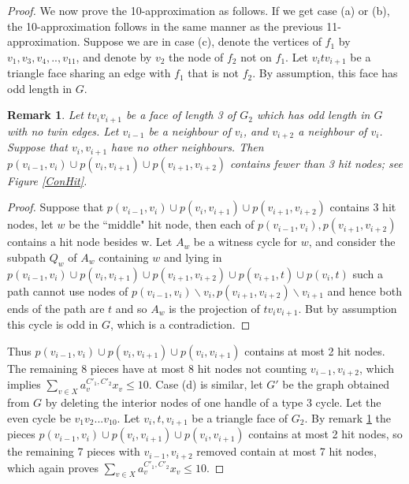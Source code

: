 \documentclass{article}
\newcommand{\0}{\mathbb{0}}
\newcommand{\1}{\mathbb{1}}
\newtheorem{remark}[theorem]{Remark}
\begin{document}
\begin{proof} 
We now prove the 10-approximation as follows. If we get case (a) or (b),  the 10-approximation follows in the same manner as the previous 11-approximation.  Suppose we are in case (c), denote the vertices of $f_1$ by  $v_1,v_3,v_4 ,.., v_{11}$, and denote by $v_2$ the node of $f_2$ not on $f_1$.  Let $v_i t v_{i+1}$ be a triangle face sharing an edge with $f_1$ that is not $f_2$. By assumption, this face has odd length in $G$.

\begin{remark}\label{consecutive}
Let $ t v_i v_{i+1} $ be a face of length 3 of $G_2$ which has odd length in $G$ with no twin edges. Let $ v_{i-1} $ be a neighbour of $v_i$, and $v_{i+2}$ a neighbour of $v_i$. Suppose that $v_i,v_{i+1}$ have no other neighbours. Then  $ p(v_{i-1} , v_i ) \cup p(v_i,v_{i+1} ) \cup p(v_{i+1},v_{i+2} ) $  contains fewer than 3 hit nodes; see Figure \ref{ConHit}.
\end{remark}
\begin{proof}
 Suppose that $ p(v_{i-1} , v_i ) \cup p(v_i,v_{i+1} ) \cup p(v_{i+1},v_{i+2} ) $ contains 3 hit nodes, let $w$ be the  ``middle" hit node, then each of $ p(v_{i-1} , v_i ) ,p(v_{i+1},v_{i+2} ) $ contains a hit node besides w. Let $A_w$ be a witness cycle for $w$, and consider the subpath $ Q_w$ of $A_w$ containing $w $ and lying in $ p(v_{i-1} , v_i ) \cup p(v_i,v_{i+1} ) \cup p(v_{i+1},v_{i+2} ) \cup p(v_{i+1},t) \cup p(v_i,t)  $  such a path cannot use nodes of $ p(v_{i-1} , v_i ) \backslash v_i ,p(v_{i+1},v_{i+2} ) \backslash v_{i+1} $  and hence both ends of the path are  $t$ and so $A_w$ is the projection of $t v_i v_{i+1} $. But by assumption this cycle is odd in $G$, which is a contradiction.  
\end{proof} 

Thus $p(v_{i-1},v_i) \cup p(v_{i},v_{i+1}) \cup p(v_{i},v_{i+1})$ contains at most 2 hit nodes. The remaining 8 pieces have at most 8 hit nodes not counting $v_{i-1},v_{i+2}$, which implies $\sum_{v \in X} a^{C'_1,C'_2}_v x_v \leq 10$.  Case (d) is similar, let $G'$ be the graph obtained from $G$ by deleting the interior nodes of one handle of a type 3 cycle. Let the even cycle be $v_1 v_2 ... v_{10}$. Let $v_i,t,v_{i+1}$ be a triangle face of $G_2$. By remark \ref{consecutive} the pieces  $p(v_{i-1},v_i) \cup p(v_{i},v_{i+1}) \cup p(v_{i},v_{i+1})$ contains at most 2 hit nodes, so the remaining 7 pieces with $v_{i-1},v_{i+2}$ removed contain at most 7 hit nodes,  which again proves $\sum_{v \in X} a^{C'_1,C'_2}_v x_v \leq 10$. 
 \end{proof}
\end{document}
